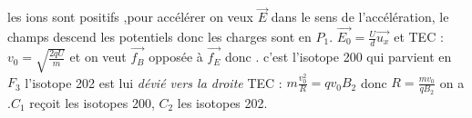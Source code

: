 \begin{Answer}
		\Question
		\subQuestion les ions sont positifs ,pour accélérer on veux $\vec{E}$ dans le sens de l'accélération, le champs descend les potentiels donc les charges sont en $P_1$. $\vec{E_0} = \frac{U}{d}\vec{u_x}$ et 
		\subQuestion TEC : $v_0=\sqrt{\frac{2qU}{m}}$
		\subQuestion {} et 
		\Question on veut $\vec{f_B}$ opposée à $\vec{f_E}$ donc .  c'est l'isotope 200 qui parvient en $F_3$ l'isotope 202 est lui \textit{dévié vers la droite}
		\Question TEC  : $m\frac{v_0^2}{R}=qv_0B_2$ donc $R=\frac{mv_0}{qB_2}$ on  a  .$C_1$ reçoit les isotopes 200, $C_2$ les isotopes 202.
\end{Answer}
